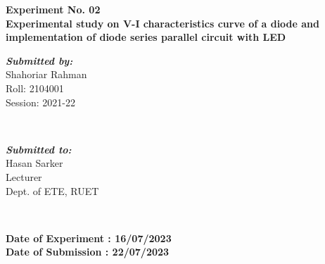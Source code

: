 \begin{titlepage}
\begin{center}
        \textbf{\Large  Experiment No. 02}
        \\[.25cm]
        \textbf{\large Experimental study on V-I characteristics curve of a diode and implementation of diode series parallel circuit with LED}
        \\
        \myrule[1pt][5pt]
        \begin{minipage}{0.4\textwidth}
            \vspace{0.5cm}
            \begin{flushleft}
                \emph{\textbf{\large Submitted by:}}
                \\
                Shahoriar Rahman \\
                Roll: 2104001 \\
                Session: 2021-22
            \end{flushleft}
        \end{minipage}
        ~
        \begin{minipage}{0.4\textwidth}
            \vspace{0.5cm}
            \begin{flushright}
                \emph{\textbf{\large Submitted to:}}
                \\
                Hasan Sarker
                \\
                Lecturer
                \\
                Dept. of ETE, RUET
                \\
            \end{flushright}
        \end{minipage}\\[0.7cm]
        \makeatother

        \textbf{Date of Experiment : 16/07/2023}\\
        \textbf{Date of Submission : 22/07/2023}\\[1cm]




\end{center}
\end{titlepage}
